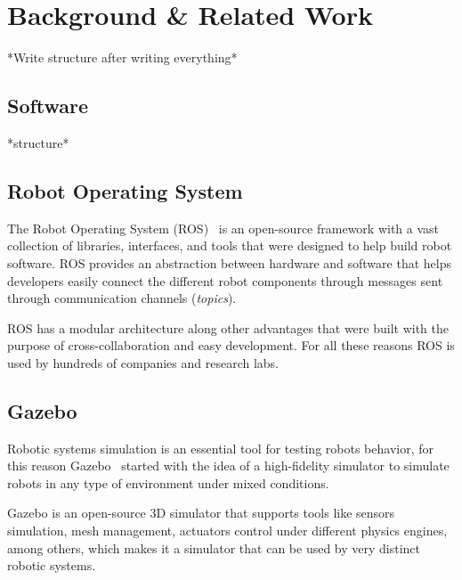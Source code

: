 \chapter{Background \& Related Work}
\label{chap:background}

*Write structure after writing everything*

\section{Software}

*structure*

\section{Robot Operating System}
\label{sec:ros}

The Robot Operating System (ROS)~\cite{quigley2009ros} is an open-source framework with a vast collection of libraries, interfaces, and tools that were designed to help build robot software. ROS provides an abstraction between hardware and software that helps developers easily connect the different robot components through messages sent through communication channels (\textit{topics}).

ROS has a modular architecture along other advantages that were built with the purpose of cross-collaboration and easy development. For all these reasons ROS is used by hundreds of companies and research labs.

\section{Gazebo}
\label{sec:gazebo}

Robotic systems simulation is an essential tool for testing robots behavior, for this reason Gazebo~\cite{koenig2004design} started with the idea of a high-fidelity simulator to simulate robots in any type of environment under mixed conditions.

Gazebo is an open-source 3D simulator that supports tools like sensors simulation, mesh management, actuators control under different physics engines, among others, which makes it a simulator that can be used by very distinct robotic systems.

